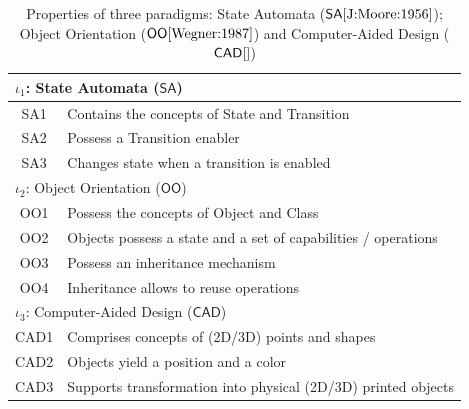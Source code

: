 \begin{table}[t]
   \begin{center}
      \begin{tabular}[t]{c l}
         \hline
         \multicolumn{2}{l}{$\iota_1$: State Automata ($\mathsf{SA}$)}\\
         \hline
         SA1 & Contains the concepts of State and Transition\\
         SA2 & Possess a Transition enabler\\
         SA3 & Changes state when a transition is enabled\\
         \hline\hline
         \multicolumn{2}{l}{$\iota_2$: Object Orientation ($\mathsf{OO}$)}\\
         \hline
         OO1 & Possess the concepts of Object and Class\\
         OO2 & Objects possess a state and a set of capabilities / operations \\
         OO3 & Possess an inheritance mechanism\\
         OO4 & Inheritance allows to reuse operations\\
         \hline\hline
         \multicolumn{2}{l}{$\iota_3$: Computer-Aided Design ($\mathsf{CAD}$)}\\
         \hline
         CAD1 & Comprises concepts of (2D/3D) points and shapes\\
         CAD2 & Objects yield a position and a color\\
         CAD3 & Supports transformation into physical (2D/3D) printed objects\\
         \hline
      \end{tabular}
   \end{center}
   \label{tab:Properties}
   \caption{Properties of three paradigms: State Automata ($\mathsf{SA} 
\cite{J:Moore:1956}$); Object Orientation ($\mathsf{OO} \cite{Wegner:1987}$) 
and Computer-Aided Design ($\mathsf{CAD} \cite{}$)}
\end{table}
